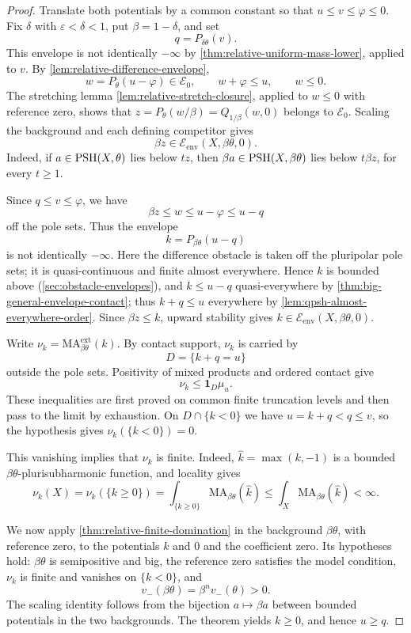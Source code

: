 \begin{proof}
Translate both potentials by a common constant so that $u\leq v\leq\varphi\leq0$. Fix $\delta$ with $\varepsilon<\delta<1$, put $\beta=1-\delta$, and set
\[
 q=P_{\delta\theta}(v).
\]
This envelope is not identically $-\infty$ by \cref{thm:relative-uniform-mass-lower}, applied to $v$. By \cref{lem:relative-difference-envelope},
\[
 w=P_\theta(u-\varphi)\in\mathcal E_0,
 \qquad w+\varphi\leq u,\qquad w\leq0.
\]
The stretching lemma \cref{lem:relative-stretch-closure}, applied to $w\leq0$ with reference zero, shows that $z=P_\theta(w/\beta)=Q_{1/\beta}(w,0)$ belongs to $\mathcal E_0$. Scaling the background and each defining competitor gives
\[
 \beta z\in\mathcal E_{\mathrm{env}}(X,\beta\theta,0).
\]
Indeed, if $a\in\mathrm{PSH}(X,\theta)$ lies below $t z$, then $\beta a\in\mathrm{PSH}(X,\beta\theta)$ lies below $t\beta z$, for every $t\geq1$.

Since $q\leq v\leq\varphi$, we have
\[
 \beta z\leq w\leq u-\varphi\leq u-q
\]
off the pole sets. Thus the envelope
\[
 k=P_{\beta\theta}(u-q)
\]
is not identically $-\infty$. Here the difference obstacle is taken off the pluripolar pole sets; it is quasi-continuous and finite almost everywhere. Hence $k$ is bounded above (\cref{sec:obstacle-envelopes}), and $k\leq u-q$ quasi-everywhere by \cref{thm:big-general-envelope-contact}; thus $k+q\leq u$ everywhere by \cref{lem:qpsh-almost-everywhere-order}. Since $\beta z\leq k$, upward stability gives $k\in\mathcal E_{\mathrm{env}}(X,\beta\theta,0)$.

Write $\nu_k=\mathrm{MA}^{\mathrm{ext}}_{\beta\theta}(k)$. By contact support, $\nu_k$ is carried by
\[
 D=\{k+q=u\}
\]
outside the pole sets. Positivity of mixed products and ordered contact give
\[
 \nu_k\leq\mathbf1_D\mu_u.
\]
These inequalities are first proved on common finite truncation levels and then pass to the limit by exhaustion. On $D\cap\{k<0\}$ we have $u=k+q<q\leq v$, so the hypothesis gives $\nu_k(\{k<0\})=0$.

This vanishing implies that $\nu_k$ is finite. Indeed, $\widehat k=\max(k,-1)$ is a bounded $\beta\theta$-plurisubharmonic function, and locality gives
\[
 \nu_k(X)=\nu_k(\{k\geq0\})
 =\int_{\{k\geq0\}}\mathrm{MA}_{\beta\theta}(\widehat k)
 \leq\int_X\mathrm{MA}_{\beta\theta}(\widehat k)<\infty.
\]

We now apply \cref{thm:relative-finite-domination} in the background $\beta\theta$, with reference zero, to the potentials $k$ and $0$ and the coefficient zero. Its hypotheses hold: $\beta\theta$ is semipositive and big, the reference zero satisfies the model condition, $\nu_k$ is finite and vanishes on $\{k<0\}$, and
\[
 v_-(\beta\theta)=\beta^n v_-(\theta)>0.
\]
The scaling identity follows from the bijection $a\mapsto\beta a$ between bounded potentials in the two backgrounds. The theorem yields $k\geq0$, and hence $u\geq q$.


\end{proof}
